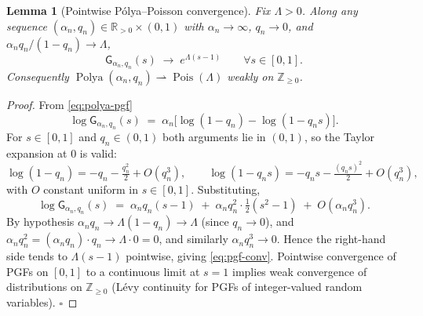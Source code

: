 \documentclass[11pt]{article}
\newcommand{\R}{\mathbb{R}}
\newcommand{\Z}{\mathbb{Z}}
\newcommand{\PGF}{\mathsf{G}}
\DeclareMathOperator{\Pol}{Polya}
\DeclareMathOperator{\Poi}{Pois}
\newtheorem{lemma}[theorem]{Lemma}
\theoremstyle{definition}
\begin{document}
\begin{lemma}[Pointwise Pólya--Poisson convergence]\label{lem:pgf}
Fix $\Lambda > 0$. Along any sequence
$(\alpha_n, q_n) \in \R_{>0}\times(0,1)$ with
$\alpha_n \to \infty$, $q_n \to 0$, and
$\alpha_n q_n / (1-q_n) \to \Lambda$,
\begin{equation}
\PGF_{\alpha_n, q_n}(s) \;\longrightarrow\; e^{\Lambda(s-1)}
\qquad \forall s \in [0, 1].
\label{eq:pgf-conv}
\end{equation}
Consequently $\Pol(\alpha_n, q_n) \rightharpoonup \Poi(\Lambda)$
weakly on $\Z_{\ge 0}$.
\end{lemma}
\begin{proof}
From \eqref{eq:polya-pgf}
\begin{equation*}
\log\PGF_{\alpha_n, q_n}(s)
\;=\;
\alpha_n\bigl[\log(1-q_n) - \log(1 - q_n s)\bigr].
\end{equation*}
For $s \in [0, 1]$ and $q_n \in (0,1)$ both arguments lie in $(0,1)$,
so the Taylor expansion at $0$ is valid:
\begin{equation*}
\log(1 - q_n) = -q_n - \tfrac{q_n^2}{2} + O(q_n^3),
\qquad
\log(1 - q_n s) = -q_n s - \tfrac{(q_n s)^2}{2} + O(q_n^3),
\end{equation*}
with $O$ constant uniform in $s\in[0,1]$. Substituting,
\begin{equation*}
\log\PGF_{\alpha_n, q_n}(s)
\;=\;
\alpha_n q_n (s - 1)
\;+\; \alpha_n q_n^2 \cdot \tfrac{1}{2}(s^2 - 1)
\;+\; O(\alpha_n q_n^3).
\end{equation*}
By hypothesis $\alpha_n q_n \to \Lambda(1 - q_n) \to \Lambda$
(since $q_n\to 0$), and
$\alpha_n q_n^2 = (\alpha_n q_n) \cdot q_n \to \Lambda \cdot 0 = 0$,
and similarly $\alpha_n q_n^3 \to 0$. Hence the right-hand side
tends to $\Lambda(s-1)$ pointwise, giving \eqref{eq:pgf-conv}.
Pointwise convergence of PGFs on $[0,1]$ to a continuous limit at
$s = 1$ implies weak convergence of distributions on $\Z_{\ge 0}$
(L\'evy continuity for PGFs of integer-valued random variables).
$\square$
\end{proof}
\end{document}
